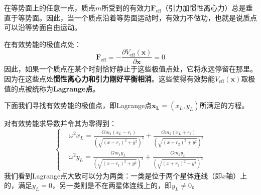 \documentclass[a4paper,openany]{book}
\begin{document}

在等势面上的任意一点，质点$m$所受到的有效力$\bm{F}_{\mathrm{eff}}$（引力加惯性离心力）总是垂直于等势面。因此，当一个质点沿着等势面运动时，有效力不做功，也就是说质点可以沿等势面自由运动。

在有效势能的极值点处：
\[
    \bm{F}_{\mathrm{eff}} = -\frac{\partial V_{\mathrm{eff}}(\bm{x})}{\partial\bm{x}} = 0
\]
因此，如果一个质点在某个时刻恰好静止于这些极值点处，它将永远停留在那里。因为在这些点处\textbf{惯性离心力和引力刚好平衡相消}。这些使得有效势能$V_{\mathrm{eff}}(\bm{x})$取极值的点被统称为\textbf{Lagrange点}。

下面我们寻找有效势能的极值点，即Lagrange点$\bm{x_L} = (x_L,y_L)$所满足的方程。

对有效势能求导数并令其为零得到：
\[
    \tag{$\ast$}
\left\{
\begin{aligned}
    &\omega^2 x_L = \frac{Gm_1(x_L-r_1)}{\left(\sqrt{(x-r_1)^2 + y^2}\right)^3} + \frac{Gm_2(x_L+r_2)}{\left(\sqrt{(x+r_2)^2 + y^2}\right)^3} \\
    &\omega^2 y_L = \frac{Gm_1y_L}{\left(\sqrt{(x-r_1)^2 + y^2}\right)^3} + \frac{Gm_2y_L}{\left(\sqrt{(x+r_2)^2 + y^2}\right)^3}
\end{aligned}
\right.
\]
我们看到Lagrange点大致可以分为两类：一类是位于两个星体连线（即$x$轴）上的，满足$y_L = 0$，另一类则是不在两星体连线上的，即$y_L \neq 0$。
\end{document}
